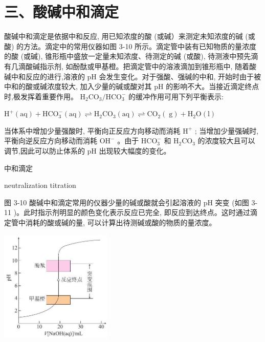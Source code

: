 \documentclass[10pt]{article}
\begin{document}
\section*{三、酸碱中和滴定}

酸碱中和滴定是依据中和反应, 用已知浓度的酸 (或碱）来测定未知浓度的碱 (或酸) 的方法。滴定中的常用仪器如图 3-10 所示。滴定管中装有已知物质的量浓度的酸 (或碱), 锥形瓶中盛放一定量未知浓度、待测定的碱 (或酸), 待测液中预先滴有几滴酸碱指示剂, 如酚酞或甲基橙。把滴定管中的溶液滴加到锥形瓶中, 随着酸碱中和反应的进行,溶液的 \(\mathrm{{pH}}\) 会发生变化。对于强酸、强碱的中和, 开始时由于被中和的酸或碱浓度较大, 加入少量的碱或酸对其 \(\mathrm{{pH}}\) 的影响不大。当接近滴定终点时,极发挥着重要作用。 \({\mathrm{H}}_{2}{\mathrm{{CO}}}_{3}/{\mathrm{{HCO}}}_{3}^{ - }\) 的缓冲作用可用下列平衡表示:

\({\mathrm{H}}^{ + }\left( \mathrm{{aq}}\right) + {\mathrm{{HCO}}}_{3}^{ - }\left( \mathrm{{aq}}\right) \rightleftharpoons {\mathrm{H}}_{2}{\mathrm{{CO}}}_{3}\left( \mathrm{{aq}}\right) \rightleftharpoons {\mathrm{{CO}}}_{2}\left( \mathrm{\;g}\right) + {\mathrm{H}}_{2}\mathrm{O}\left( \mathrm{l}\right)\)

当体系中增加少量强酸时, 平衡向正反应方向移动而消耗 \({\mathrm{H}}^{ + }\) ; 当增加少量强碱时, 平衡向逆反应方向移动而消耗 \({\mathrm{{OH}}}^{ - }\) 。由于 \({\mathrm{{HCO}}}_{3}^{ - }\) 和 \({\mathrm{H}}_{2}{\mathrm{{CO}}}_{3}\) 的浓度较大且可以调节,因此可以防止体系的 \(\mathrm{{pH}}\) 出现较大幅度的变化。

\begin{mdframed}

中和滴定

neutralization titration

\end{mdframed}

图 3-10 酸碱中和滴定常用的仪器少量的碱或酸就会引起溶液的 \(\mathrm{{pH}}\) 突变 (如图 3-11 )。此时指示剂明显的颜色变化表示反应已完全, 即反应到达终点。这时通过滴定管中消耗的酸或碱的量, 可以计算出待测碱或酸的物质的量浓度。

\begin{center}
\includegraphics[max width=0.4\textwidth]{images/0190da9d-8bfd-732f-bc2c-0b21d0f13b91_73_224661.jpg}
\end{center}
\end{document}
